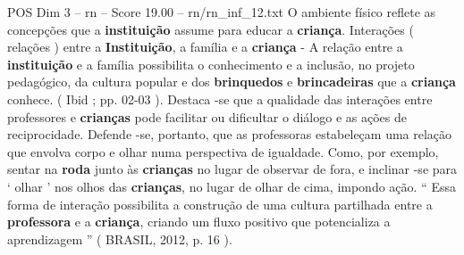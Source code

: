 \begin{textsample}{POS Dim 3 – rn – Score 19.00 – rn/rn\_inf\_12.txt}
O ambiente físico reflete as concepções que a \textbf{instituição} assume para educar a \textbf{criança}.
Interações ( relações ) entre a \textbf{Instituição}, a família e a \textbf{criança} - A relação entre a \textbf{instituição} e a família possibilita o conhecimento e a inclusão, no projeto pedagógico, da cultura popular e dos \textbf{brinquedos} e \textbf{brincadeiras} que a \textbf{criança} conhece. ( Ibid ; pp. 02-03 ).
Destaca -se que a qualidade das interações entre professores e \textbf{crianças} pode facilitar ou dificultar o diálogo e as ações de reciprocidade.
Defende -se, portanto, que as professoras estabeleçam uma relação que envolva corpo e olhar numa perspectiva de igualdade.
Como, por exemplo, sentar na \textbf{roda} junto às \textbf{crianças} no lugar de observar de fora, e inclinar -se para ‘ olhar ’ nos olhos das \textbf{crianças}, no lugar de olhar de cima, impondo ação. “ Essa forma de interação possibilita a construção de uma cultura partilhada entre a \textbf{professora} e a \textbf{criança}, criando um fluxo positivo que potencializa a aprendizagem ” ( BRASIL, 2012, p. 16 ).

\end{textsample}
